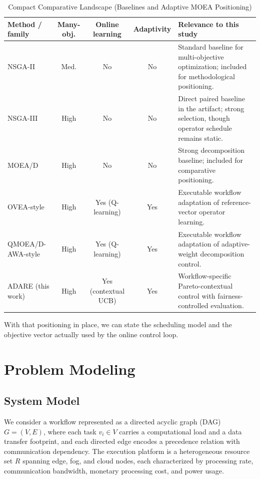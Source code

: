 \documentclass[runningheads]{llncs}
\begin{document}
\begin{table}[t]
\caption{Compact Comparative Landscape (Baselines and Adaptive MOEA Positioning)}
\label{tab:baseline_landscape}
\centering
\scriptsize
\begin{tabularx}{\textwidth}{@{}l c c c >{\raggedright\arraybackslash}X@{}}
\toprule
Method / family & Many-obj. & Online learning & Adaptivity & Relevance to this study \\
\midrule
NSGA-II \cite{deb2002nsga2} & Med. & No & No & Standard baseline for multi-objective optimization; included for methodological positioning. \\
NSGA-III \cite{deb2014nsga3} & High & No & No & Direct paired baseline in the artifact; strong selection, though operator schedule remains static. \\
MOEA/D \cite{zhang2007moead} & High & No & No & Strong decomposition baseline; included for comparative positioning. \\
OVEA-style \cite{jiao2023ovea} & High & Yes (Q-learning) & Yes & Executable workflow adaptation of reference-vector operator learning. \\
QMOEA/D-AWA-style \cite{wang2026qmoeadawa} & High & Yes (Q-learning) & Yes & Executable workflow adaptation of adaptive-weight decomposition control. \\
ADARE (this work) & High & Yes (contextual UCB) & Yes & Workflow-specific Pareto-contextual control with fairness-controlled evaluation. \\
\bottomrule
\end{tabularx}
\end{table}

With that positioning in place, we can state the scheduling model and the objective vector actually used by the online control loop.

\section{Problem Modeling}
\subsection{System Model}
We consider a workflow represented as a directed acyclic graph (DAG) $G=(V,E)$, where each task $v_i \in V$ carries a computational load and a data transfer footprint, and each directed edge encodes a precedence relation with communication dependency. The execution platform is a heterogeneous resource set $R$ spanning edge, fog, and cloud nodes, each characterized by processing rate, communication bandwidth, monetary processing cost, and power usage.
\end{document}
